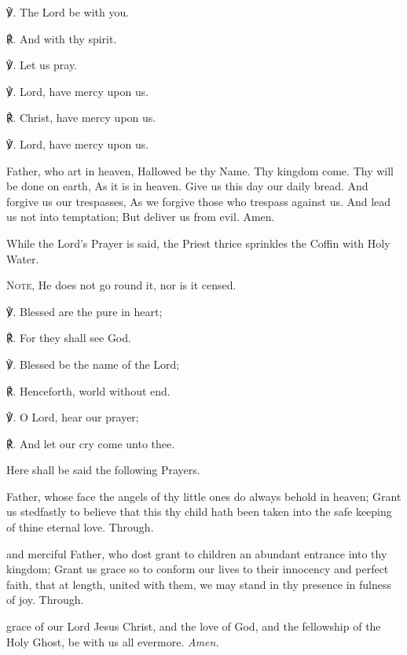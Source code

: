 ℣. The Lord be with you.

℟. And with thy spirit.

℣. Let us pray.

℣. Lord, have mercy upon us.

℟. Christ, have mercy upon us.

℣. Lord, have mercy upon us.

\clearpage
{} Father, who art in heaven, Hallowed be thy Name. Thy kingdom come. Thy will be done on earth, As it is in heaven. Give us this day our daily bread. And forgive us our trespasses, As we forgive those who trespass against us. And lead us not into temptation; But deliver us from evil. Amen.

\begin{rubric}
    While the Lord's Prayer is said, the Priest thrice sprinkles the Coffin with Holy Water.\par
    \textsc{Note,} He does not go round it, nor is it censed.
\end{rubric}\par
℣. Blessed are the pure in heart;\par
℟. For they shall see God.\par
℣. Blessed be the name of the Lord;\par
℟. Henceforth, world without end.\par
℣. O Lord, hear our prayer;\par
℟. And let our cry come unto thee.\par
\begin{rubric}
    Here shall be said the following Prayers.
\end{rubric}\par

 Father, whose face the angels of thy little ones do always behold in heaven; Grant us stedfastly to believe that this thy child hath been taken into the safe keeping of thine eternal love. Through.\par

 and merciful Father, who dost grant to children an abundant entrance into thy kingdom; Grant us grace so to conform our lives to their innocency and perfect faith, that at length, united with them, we may stand in thy presence in fulness of joy. Through.\par

 grace of our Lord Jesus {} Christ, and the love of God, and the fellowship of the Holy Ghost, be with us all evermore. \textit{Amen.}

